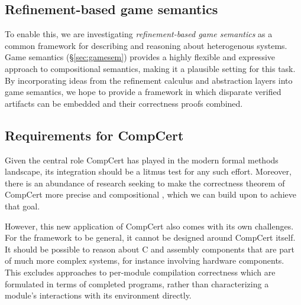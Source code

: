\documentclass[sigplan,10pt,review,anonymous]{acmart}
\begin{document}

\subsection{Refinement-based game semantics} %

To enable this,
we are investigating
\emph{refinement-based game semantics}
as a common framework for
describing and reasoning about heterogenous systems.
Game semantics (\S\ref{sec:gamesem})
provides a highly flexible and expressive approach
to compositional semantics,
making it a plausible setting for this task.
By incorporating ideas from
the refinement calculus \cite{refcal}
and abstraction layers \cite{popl15}
into game semantics,
we hope to provide a framework
in which disparate verified artifacts
can be embedded and their correctness proofs combined.


\subsection{Requirements for CompCert} \label{sec:compcertreq} %

Given the central role CompCert has played
in the modern formal methods landscape,
its integration
should be a litmus test for any such effort.
Moreover, there is an abundance of research
seeking to make the correctness theorem of CompCert
more precise and compositional
\cite{qompcert,sepcompcert,compcompcert,compcerttso,compcertshm,compcertm},
which we can build upon to achieve that goal.

However, this new application of CompCert also
comes with its own challenges.
For the framework to be general,
it cannot be designed around CompCert itself.
It should be possible to reason about
C and assembly components that are part of
much more complex systems,
for instance
involving hardware components.
This excludes approaches to
per-module compilation correctness which are formulated in terms
of completed programs,
rather than characterizing a module's interactions
with its environment directly.
\end{document}
